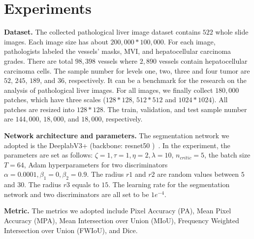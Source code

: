 \documentclass[letterpaper]{article} %
\begin{document}
\section{Experiments}
\textbf{Dataset.} The collected pathological liver image dataset contains $522$ whole slide images.
Each image size has about $200,000*100,000$.
 For each image, pathologists labeled the vessels' masks, MVI, and hepatocellular carcinoma grades.
 There are total $98,398$ vessels where $2,890$ vessels contain hepatocellular carcinoma cells.
 The sample number for levels one, two, three and four tumor are $52$, $245$, $189$, and $36$, respectively.
It can be a benchmark for the research on the analysis of pathological liver images.
For all images, we finally collect $180,000$ patches, which have three scales ($128*128$, $512*512$ and $1024*1024$).
All patches are resized into $128*128$. The train, validation, and test sample number are $144,000$, $18,000$, and $18,000$, respectively.


\textbf{Network architecture and parameters.} The segmentation network we adopted is the DeeplabV3+ (backbone: resnet50 )~\cite{chen2017rethinking}. In the experiment, the parameters are set as follows: $\zeta=1, \tau =1,\eta =2, \lambda = 10$, $n_{critic}=5$, the batch size $T =64$, Adam hyperparameters for two discriminators $\alpha =0.0001,\beta_{1}=0,\beta_{2}=0.9$.
The radius $r1$ and $r2$ are random values between $5$ and $30$. The radius $r3$ equals to $15$.
The learning rate for the segmentation network and two discriminators are all set to be  $1e^{-4}$.

\textbf{Metric.} The metrics we adopted include Pixel Accuracy (PA), Mean Pixel Accuracy (MPA), Mean Intersection over Union (MIoU), Frequency Weighted Intersection over Union (FWIoU), and Dice.

\end{document}
